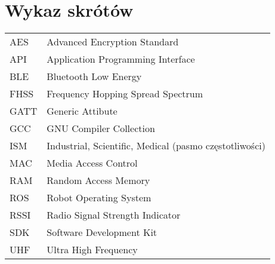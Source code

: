 \chapter*{Wykaz skrótów}

\begin{tabular}{l l}
AES & Advanced Encryption Standard \\
API & Application Programming Interface \\
BLE & Bluetooth Low Energy \\
FHSS & Frequency Hopping Spread Spectrum \\
GATT & Generic Attibute \\
GCC & GNU Compiler Collection \\
ISM & Industrial, Scientific, Medical (pasmo częstotliwości) \\
MAC & Media Access Control \\
RAM & Random Access Memory \\
ROS & Robot Operating System \\
RSSI & Radio Signal Strength Indicator \\
SDK & Software Development Kit \\
UHF & Ultra High Frequency \\




\end{tabular}

